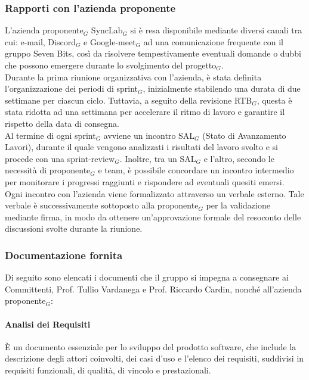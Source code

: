 \documentclass[10pt]{article}
\begin{document}
\begin{justify}
    \subsubsection{Rapporti con l'azienda proponente}
    L'azienda proponente$_G$ SyncLab$_G$ si è resa disponibile mediante diversi canali tra cui: e-mail, Discord$_G$ e Google-meet$_G$ ad una comunicazione frequente con il gruppo Seven Bits, così da risolvere tempestivamente eventuali domande o dubbi che possono emergere durante lo svolgimento del progetto$_G$.\\
    Durante la prima riunione organizzativa con l'azienda, è stata definita l'organizzazione dei periodi di sprint$_G$, inizialmente stabilendo una durata di due settimane per ciascun ciclo. Tuttavia, a seguito della revisione RTB$_G$, questa è stata ridotta ad una settimana per accelerare il ritmo di lavoro e garantire il rispetto della data di consegna.\\
    Al termine di ogni sprint$_G$ avviene un incontro SAL$_G$ (Stato di Avanzamento Lavori), durante il quale vengono analizzati i risultati del lavoro svolto e si procede con una sprint-review$_G$. Inoltre, tra un SAL$_G$ e l'altro, secondo le necessità di proponente$_G$ e team, è possibile concordare un incontro intermedio per monitorare i progressi raggiunti e rispondere ad eventuali quesiti emersi.\\
    Ogni incontro con l'azienda viene formalizzato attraverso un verbale esterno. Tale verbale è successivamente sottoposto alla proponente$_G$ per la validazione mediante firma, in modo da ottenere un'approvazione formale del resoconto delle discussioni svolte durante la riunione.\\

    \subsubsection{Documentazione fornita}
    Di seguito sono elencati i documenti che il gruppo si impegna a consegnare ai Committenti, Prof. Tullio Vardanega e Prof. Riccardo Cardin, nonché all'azienda proponente$_G$:\\

        \paragraph{Analisi dei Requisiti}
        È un documento essenziale per lo sviluppo del prodotto software, che include la descrizione degli attori coinvolti, dei casi d'uso e l'elenco dei requisiti, suddivisi in requisiti funzionali, di qualità, di vincolo e prestazionali.\\


\end{justify}
\end{document}
